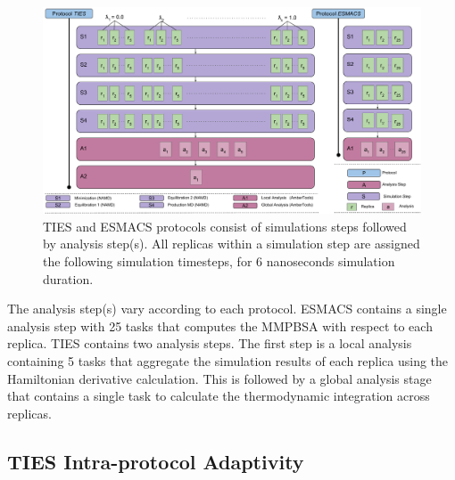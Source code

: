 \begin{figure}
  \centering
  \includegraphics[width=\columnwidth]{figures/ties_esmacs_application_model.pdf}
  \caption{TIES and ESMACS protocols consist of simulations steps followed 
  by analysis step(s). All replicas within a simulation step are assigned the 
  following simulation timesteps, for 6 nanoseconds simulation duration.}

\label{fig:ties_esmacs_application}
\end{figure}

The analysis step(s) vary according to each protocol. ESMACS contains a 
single analysis step with 25 tasks that computes the MMPBSA with respect to each 
replica. TIES contains two 
analysis steps. The first step is a local analysis containing 5 tasks that 
aggregate the simulation results of each replica using the Hamiltonian 
derivative calculation. This is followed by a global analysis stage that 
contains a single task to calculate the thermodynamic integration across 
replicas. 


\subsection{TIES Intra-protocol Adaptivity} 

